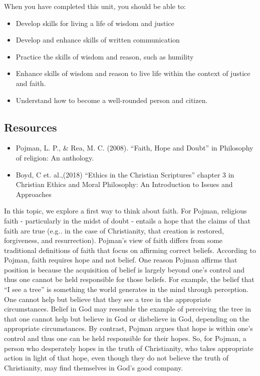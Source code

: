\documentclass[
]{book}
\providecommand{\tightlist}{%
  \setlength{\itemsep}{0pt}\setlength{\parskip}{0pt}}
\begin{document}
When you have completed this unit, you should be able to:

\begin{itemize}
\tightlist
\item
  Develop skills for living a life of wisdom and justice
\item
  Develop and enhance skills of written communication
\item
  Practice the skills of wisdom and reason, such as humility
\item
  Enhance skills of wisdom and reason to live life within the context of justice and faith.
\item
  Understand how to become a well-rounded person and citizen.
\end{itemize}

\hypertarget{resources-2}{%
\subsection*{Resources}\label{resources-2}}

\begin{itemize}
\tightlist
\item
  Pojman, L. P., \& Rea, M. C. (2008). ``Faith, Hope and Doubt'' in Philosophy of religion: An anthology.
\item
  Boyd, C et. al.,(2018) ``Ethics in the Christian Scriptures'' chapter 3 in Christian Ethics and Moral Philosophy: An Introduction to Issues and Approaches
\end{itemize}

In this topic, we explore a first way to think about faith. For Pojman, religious faith - particularly in the midst of doubt - entails a hope that the claims of that faith are true (e.g.. in the case of Christianity, that creation is restored, forgiveness, and resurrection). Pojman's view of faith differs from some traditional definitions of faith that focus on affirming correct beliefs. According to Pojman, faith requires hope and not belief. One reason Pojman affirms that position is because the acquisition of belief is largely beyond one's control and thus one cannot be held responsible for those beliefs. For example, the belief that ``I see a tree'' is something the world generates in the mind through perception. One cannot help but believe that they see a tree in the appropriate circumstances. Belief in God may resemble the example of perceiving the tree in that one cannot help but believe in God or disbelieve in God, depending on the appropriate circumstances. By contrast, Pojman argues that hope is within one's control and thus one can be held responsible for their hopes. So, for Pojman, a person who desperately hopes in the truth of Christianity, who takes appropriate action in light of that hope, even though they do not believe the truth of Christianity, may find themselves in God's good company.
\end{document}
